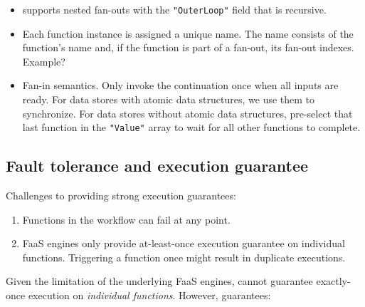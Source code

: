 \begin{itemize}
	\item \name{} supports nested fan-outs with the \texttt{"OuterLoop"} field
	that is recursive.

	\item Each function instance is assigned a unique name. The name consists
	of the function's name and, if the function is part of a fan-out, its
	fan-out indexes. Example?

	\item Fan-in semantics. Only invoke the continuation once when all inputs
	are ready. For data stores with atomic data structures, we use them to
	synchronize. For data stores without atomic data structures, \name{}
	pre-select that last function in the \texttt{"Value"} array to wait for
	all other functions to complete.

\end{itemize}









\subsection{Fault tolerance and execution guarantee}\label{sec:design-exec-gntee}

Challenges to providing strong execution guarantees:

\begin{enumerate}

	\item Functions in the workflow can fail at any point.

	\item FaaS engines only provide at-least-once execution guarantee on
	individual functions. Triggering a function once might result in duplicate
	executions.

\end{enumerate}

Given the limitation of the underlying FaaS engines, \name{} cannot guarantee
exactly-once execution on \emph{individual functions}. However, \name{}
guarantees:


